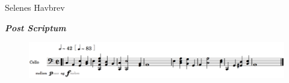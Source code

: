 \bigskip
\bigskip
\bigskip

\begin{center} 
{\color{lightgray}\textsf{\small Selenes Havbrev}}
\bigskip

\textbf{\textsl{Post Scriptum}}

{}
 \end{center} 
 
\bigskip 

\begin{figure}[h!]
		\includegraphics[width=1\textwidth]{mp/img/img7}
		\label{ps}
\end{figure}
